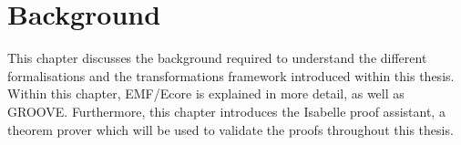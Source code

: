 \chapter{Background}
\label{chapter:background}

This chapter discusses the background required to understand the different formalisations and the transformations framework introduced within this thesis. Within this chapter, EMF/Ecore is explained in more detail, as well as GROOVE. Furthermore, this chapter introduces the Isabelle proof assistant, a theorem prover which will be used to validate the proofs throughout this thesis.



